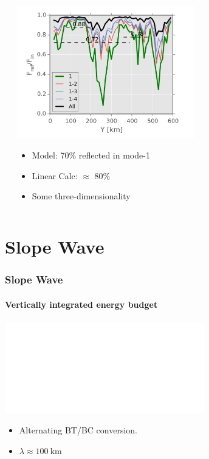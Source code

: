 \documentclass[aspectratio=169]{beamer}
\begin{document}
\begin{frame}
\begin{columns}
\begin{column}{0.2\textwidth}
    \end{column}
    \begin{column}{0.75\textwidth}
      \includegraphics[width=0.6\textwidth]{doc/MyKelly2.png}  
      \begin{itemize}
        \item Model: 70\% reflected in mode-1
        \item Linear Calc: $\approx$ 80\% 
        \item Some three-dimensionality
      \end{itemize}      
    \end{column}
  \end{columns}
\end{frame}

\section{Slope Wave}
\begin{frame}

  \frametitle{Slope Wave}
  \framesubtitle{Vertically integrated energy budget}
  \begin{center}
    \includegraphics<1->[width=0.65\textwidth,trim=0 0 0 0, clip]{doc/DissReal1km03cycle20.pdf}
  \end{center}
  \begin{itemize}
    \item Alternating BT/BC conversion.
    \item $\lambda\approx 100 \ \mathrm{km}$
  \end{itemize}
\end{frame}
\end{document}
